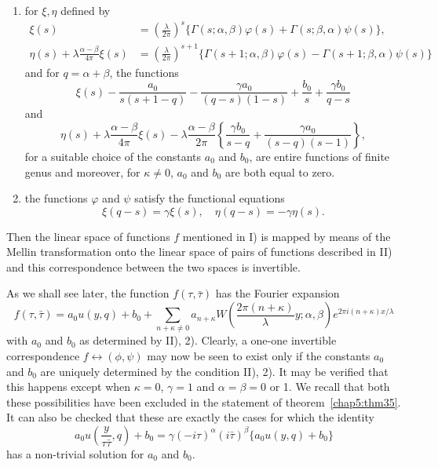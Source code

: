 \begin{thm}
\begin{enumerate}
\begin{enumerate}
\item for $\xi, \eta$ defined by 
\begin{align*}
\xi (s) & = (\frac{\lambda}{2\pi})^s \{\Gamma(s;\alpha,\beta)
\varphi(s) + \Gamma(s;\beta, \alpha)\psi (s)\},\\
\eta(s)+\lambda\frac{\alpha-\beta}{4\pi}\xi(s) & =
(\frac{\lambda}{2\pi})^{s+1} \{
\Gamma(s+1;\alpha,\beta)\varphi(s)-\Gamma(s+1;\beta,\alpha) \psi (s)\}
\end{align*}
and for $q=\alpha+\beta$, the functions
\begin{equation*}
\xi(s) -\frac{a_0}{s(s+1-q)} -\frac{\gamma a_0}{(q-s)(1-s)} + \frac{b_0}{s}
 + \frac{\gamma b_0}{q-s} \tag{1}\label{c5:eq2:1}
\end{equation*}
and
\begin{equation*}
\eta(s) + \lambda\frac{\alpha-\beta}{4\pi} \xi (s) -\lambda
\frac{\alpha-\beta}{2\pi} \left\{\frac{\gamma b_0}{s-q} + \frac{\gamma
  a_0}{(s-q)(s-1)}\right\}, \tag{2}\label{c5:eq2:2}
\end{equation*}
for a suitable choice of the constants $a_0$ and $b_0$, are entire
functions of finite genus and moreover, for $\kappa\neq 0$, $a_0$ and
$b_0$ are both equal to zero.

\item the functions $\varphi$ and $\psi$ satisfy the functional
  equations 
$$
  \xi(q-s) = \gamma\xi(s), \quad \eta(q-s)=-\gamma\eta(s).
$$
\end{enumerate}

Then the linear space of functions $f$ mentioned in I) is mapped by
means of the Mellin transformation onto the linear space of pairs of
functions described \pageoriginale in II) and this correspondence
between the two spaces is invertible.
\end{enumerate}
\end{thm}

\begin{remark*}
As we shall see later, the function $f(\tau,\bar{\tau})$ has the
Fourier expansion
\begin{equation*}
f(\tau,\bar{\tau}) = a_0 u (y,q) + b_0 + \sum_{n+\kappa \neq 0}
a_{n+\kappa} W (\frac{2\pi(n+\kappa)}{\lambda} y;\alpha,\beta) e^{2\pi
i (n+\kappa)x/\lambda} \tag{3}\label{c5:eq2:3}
\end{equation*}
with $a_0$ and $b_0$ as determined by II), 2). Clearly, a one-one
invertible correspondence $f\longleftrightarrow (\phi, \psi)$ may now
be seen to 
exist only if the constants $a_0$ and $b_0$ are uniquely determined by
the condition II), 2). It may be verified that this happens except
when $\kappa=0$, $\gamma=1$ and $\alpha=\beta=0$ or 1. We recall that both
these possibilities have been excluded in the statement of 
theorem~\ref{chap5:thm35}. It can also be checked that 
these are exactly the cases for which the identity
$$
a_0u(\frac{y}{\tau\bar{\tau}},q) + b_0 = \gamma(-i\tau)^{\alpha}
(i\bar{\tau})^{\beta} \{a_0u(y,q)+b_0\}
$$
has a non-trivial solution for $a_0$ and $b_0$.
\end{remark*}

